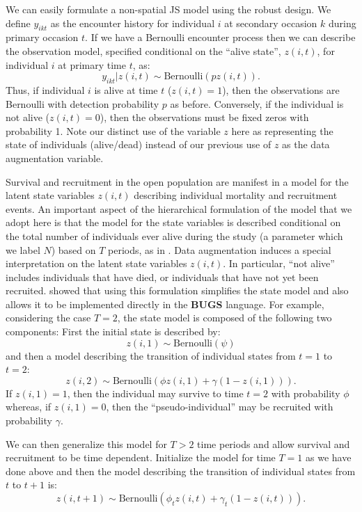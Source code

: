We can easily formulate
 a non-spatial JS
model using the robust design.  We 
define $y_{ikt}$ as the encounter history for individual
$i$ at secondary occasion $k$ during primary occasion $t$.  If we have
a Bernoulli encounter process then we can describe the observation
model, specified conditional on the ``alive state'', $z(i,t)$, for
individual $i$ at primary time $t$, as:
 \[
  y_{ikt}|z(i,t) \sim
\mbox{Bernoulli}(p z(i,t)).
\]
Thus, if individual $i$ is alive at time $t$ ($z(i,t)=1$), then the
observations are Bernoulli with detection probability $p$ as before.  Conversely, if the individual is
not alive ($z(i,t)=0$), then the observations must be fixed zeros with
probability 1. Note our distinct use of the variable $z$ here as
representing the state of individuals (alive/dead) instead of our
previous use of $z$ as the data augmentation variable. 

Survival and recruitment in the open population are manifest in a
model for the latent state variables $z(i,t)$ describing individual
mortality and recruitment events.  An important aspect of the
hierarchical formulation of the model that we adopt here is that the
model for the state variables is described conditional on the total
number of individuals ever alive during the study (a parameter which
we label $N$) based on $T$ periods, as in \cite{schwarz_arnason:1996}.  Data
augmentation induces a special interpretation on the latent state
variables $z(i,t)$.
In particular, ``not alive'' includes individuals
that have died, or individuals that have not yet been recruited.
\citep{royle_dorazio:2008} showed that using this formulation
simplifies the state model and also allows it
to be implemented directly in the \textbf{BUGS} language.
For example, considering the case $T=2$, the state model is composed
of the following two components: First the initial state is described
by:
\[
 z(i,1) \sim \mbox{Bernoulli}(\psi)
\]
and then a model describing the transition of individual states from
$t=1$ to $t=2$:
\[
 z(i,2) \sim \mbox{Bernoulli}( \phi z(i,1)  + \gamma (1-z(i,1)) ).
\]
If $z(i,1)=1$, then the individual may survive to time $t=2$ with
probability $\phi$ whereas, if $z(i,1)=0$, then the
``pseudo-individual'' may be recruited with probability $\gamma$.

We can then generalize this model for $T>2$ time periods and allow survival and
recruitment to be time dependent.  Initialize the
model for time $T=1$ as we have done above
and then the model describing the transition of individual states from
$t$ to $t+1$ is:
\[
 z(i,t+1) \sim \mbox{Bernoulli}( \phi_t z(i,t)  + \gamma_t (1-z(i,t)) ).
\]

